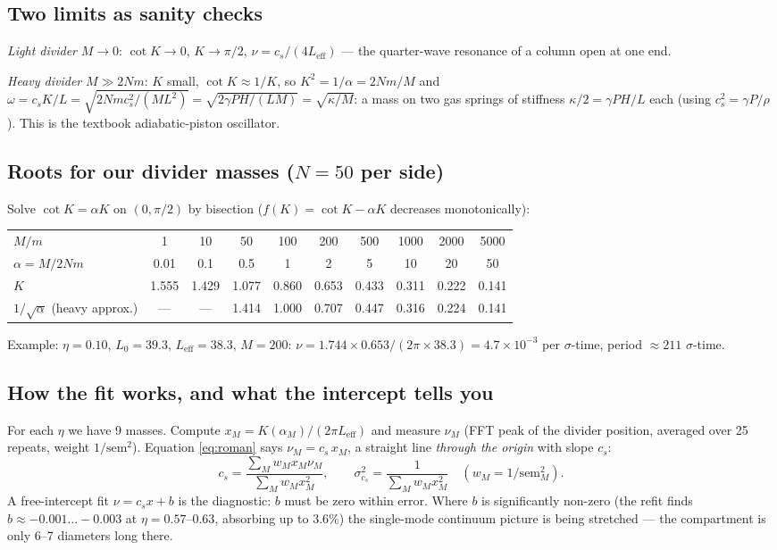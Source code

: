 \documentclass[11pt,a4paper]{article}
\begin{document}
\subsection{Two limits as sanity checks}
\begin{sanity}
\emph{Light divider} $M\to0$: $\cot K\to0$, $K\to\pi/2$, $\nu = c_s/(4L_{\mathrm{eff}})$ --- the quarter-wave resonance of a column open at one end.

\emph{Heavy divider} $M\gg 2Nm$: $K$ small, $\cot K\approx1/K$, so $K^2 = 1/\alpha = 2Nm/M$ and
$\omega = c_sK/L = \sqrt{2Nm c_s^2/(ML^2)} = \sqrt{2\gamma P H/(LM)} = \sqrt{\kappa/M}$: a mass on two gas springs of stiffness $\kappa/2 = \gamma PH/L$ each (using $c_s^2 = \gamma P/\rho$). This is the textbook adiabatic-piston oscillator.
\end{sanity}

\subsection{Roots for our divider masses (\texorpdfstring{$N = 50$}{N = 50} per side)}
Solve $\cot K = \alpha K$ on $(0,\pi/2)$ by bisection ($f(K) = \cot K - \alpha K$ decreases monotonically):
\begin{worked}
\small
\begin{tabular}{@{}lccccccccc@{}}
\toprule
$M/m$ & 1 & 10 & 50 & 100 & 200 & 500 & 1000 & 2000 & 5000\\
$\alpha = M/2Nm$ & 0.01 & 0.1 & 0.5 & 1 & 2 & 5 & 10 & 20 & 50\\
$K$ & 1.555 & 1.429 & 1.077 & 0.860 & 0.653 & 0.433 & 0.311 & 0.222 & 0.141\\
$1/\sqrt\alpha$ (heavy approx.) & --- & --- & 1.414 & 1.000 & 0.707 & 0.447 & 0.316 & 0.224 & 0.141\\
\bottomrule
\end{tabular}

Example: $\eta = 0.10$, $L_0 = 39.3$, $L_{\mathrm{eff}} = 38.3$, $M = 200$: $\nu = 1.744\times0.653/(2\pi\times38.3) = 4.7\times10^{-3}$ per $\sigma$-time, period $\approx 211$ $\sigma$-time.
\end{worked}

\subsection{How the fit works, and what the intercept tells you}
For each $\eta$ we have 9 masses. Compute $x_M = K(\alpha_M)/(2\pi L_{\mathrm{eff}})$ and measure $\nu_M$ (FFT peak of the divider position, averaged over 25 repeats, weight $1/\mathrm{sem}^2$). Equation \eqref{eq:roman} says $\nu_M = c_s\,x_M$, a straight line \emph{through the origin} with slope $c_s$:
\begin{equation}
c_s = \frac{\sum_M w_M x_M\nu_M}{\sum_M w_M x_M^2},\qquad
\sigma_{c_s}^2 = \frac{1}{\sum_M w_M x_M^2}\quad(w_M = 1/\mathrm{sem}_M^2).
\end{equation}
A free-intercept fit $\nu = c_s x + b$ is the diagnostic: $b$ must be zero within error. Where $b$ is significantly non-zero (the refit finds $b \approx -0.001\ldots-0.003$ at $\eta = 0.57$--$0.63$, absorbing up to 3.6\%) the single-mode continuum picture is being stretched --- the compartment is only 6--7 diameters long there.
\end{document}
